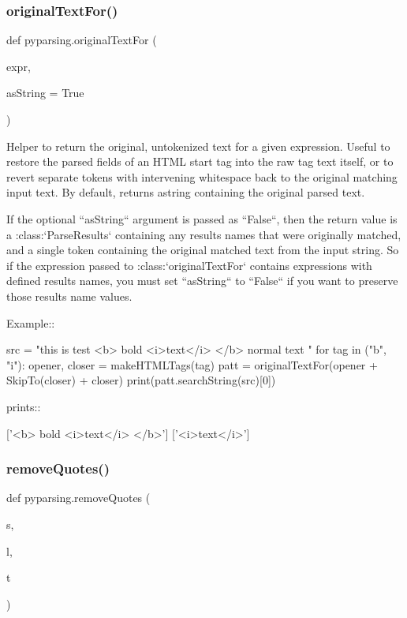 \subsubsection{\texorpdfstring{original\+Text\+For()}{originalTextFor()}}
{\footnotesize\ttfamily def pyparsing.\+original\+Text\+For (\begin{DoxyParamCaption}\item[{}]{expr,  }\item[{}]{as\+String = {\ttfamily True} }\end{DoxyParamCaption})}

\begin{DoxyVerb}Helper to return the original, untokenized text for a given
expression.  Useful to restore the parsed fields of an HTML start
tag into the raw tag text itself, or to revert separate tokens with
intervening whitespace back to the original matching input text. By
default, returns astring containing the original parsed text.

If the optional ``asString`` argument is passed as
``False``, then the return value is
a :class:`ParseResults` containing any results names that
were originally matched, and a single token containing the original
matched text from the input string.  So if the expression passed to
:class:`originalTextFor` contains expressions with defined
results names, you must set ``asString`` to ``False`` if you
want to preserve those results name values.

Example::

    src = "this is test <b> bold <i>text</i> </b> normal text "
    for tag in ("b", "i"):
        opener, closer = makeHTMLTags(tag)
        patt = originalTextFor(opener + SkipTo(closer) + closer)
        print(patt.searchString(src)[0])

prints::

    ['<b> bold <i>text</i> </b>']
    ['<i>text</i>']
\end{DoxyVerb}
 \mbox{\label{namespacepyparsing_a343049ca4aeee44db41864846afb2f9b}} 
\subsubsection{\texorpdfstring{remove\+Quotes()}{removeQuotes()}}
{\footnotesize\ttfamily def pyparsing.\+remove\+Quotes (\begin{DoxyParamCaption}\item[{}]{s,  }\item[{}]{l,  }\item[{}]{t }\end{DoxyParamCaption})}

